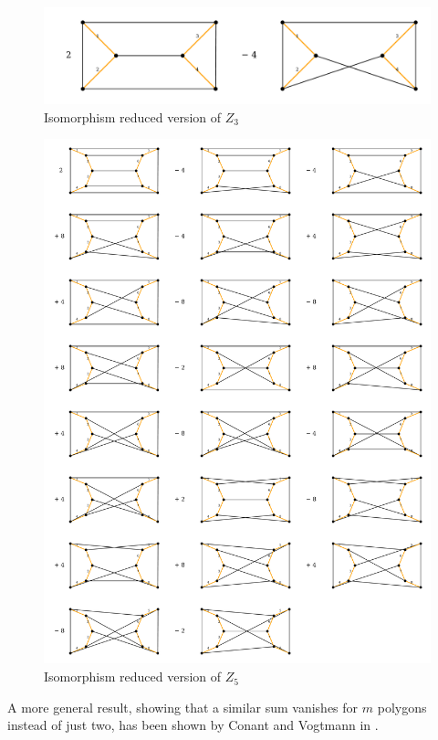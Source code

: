 \begin{figure}[h]
	\centering
	\includegraphics[width=\textwidth]{./ForestedGraphs/MCCycle3.pdf}
	\caption{Isomorphism reduced version of $Z_3$}
	\label{fig:Z3}
\end{figure}
\begin{figure}[p]
	\centering
	\includegraphics[width=\textwidth]{./ForestedGraphs/MCCycle5.pdf}
	\caption{Isomorphism reduced version of $Z_5$}
	\label{fig:Z5}
\end{figure}

A more general result, showing that a similar sum vanishes for $m$ polygons instead of just two,
has been shown by Conant and Vogtmann in \cite{conant08}.

